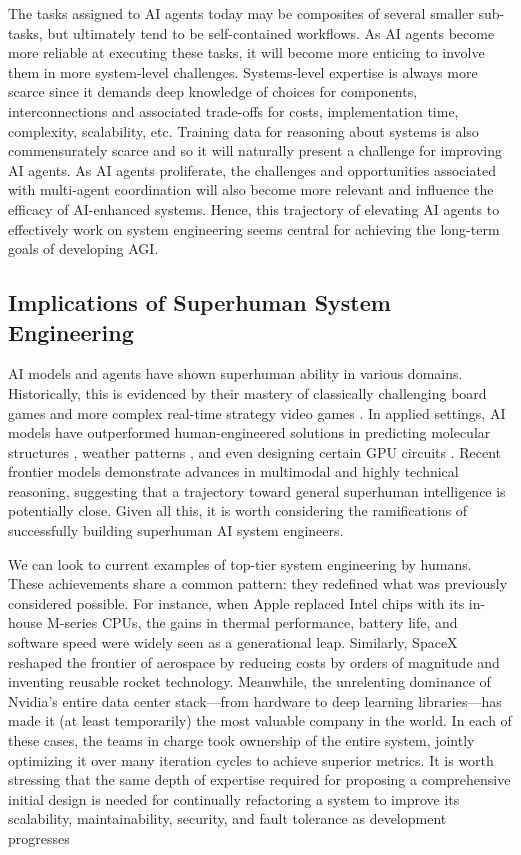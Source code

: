The tasks assigned to AI agents today may be composites of several smaller sub-tasks, but ultimately tend to be self-contained workflows. As AI agents become more reliable at executing these tasks, it will become more enticing to involve them in more system-level challenges. Systems-level expertise is always more scarce since it demands deep knowledge of choices for components, interconnections and associated trade-offs for costs, implementation time, complexity, scalability, etc. Training data for reasoning about systems is also commensurately scarce and so it will naturally present a challenge for improving AI agents. As AI agents proliferate, the challenges and opportunities associated with multi-agent coordination will also become more relevant and influence the efficacy of AI-enhanced systems. Hence, this trajectory of elevating AI agents to effectively work on system engineering seems central for achieving the long-term goals of developing AGI. 

\subsection{Implications of Superhuman System Engineering}

AI models and agents have shown superhuman ability in various domains. Historically, this is evidenced by their mastery of classically challenging board games and more complex real-time strategy video games \cite{silver2017alphazero, vinyals2019alphastar}. In applied settings, AI models have outperformed human-engineered solutions in predicting molecular structures \cite{alphafold2021}, weather patterns \cite{gencast2024}, and even designing certain GPU circuits \cite{prefixrl2021}. Recent frontier models demonstrate advances in multimodal and highly technical reasoning, suggesting that a trajectory toward general superhuman intelligence is potentially close. Given all this, it is worth considering the ramifications of successfully building superhuman AI system engineers.


We can look to current examples of top-tier system engineering by humans. These achievements share a common pattern: they redefined what was previously considered possible. For instance, when Apple replaced Intel chips with its in-house M-series CPUs, the gains in thermal performance, battery life, and software speed were widely seen as a generational leap. Similarly, SpaceX reshaped the frontier of aerospace by reducing costs by orders of magnitude and inventing reusable rocket technology. Meanwhile, the unrelenting dominance of Nvidia’s entire data center stack—from hardware to deep learning libraries—has made it (at least temporarily) the most valuable company in the world. In each of these cases, the teams in charge took ownership of the entire system, jointly optimizing it over many iteration cycles to achieve superior metrics. It is worth stressing that the same depth of expertise required for proposing a comprehensive initial design is needed for continually refactoring a system to improve its scalability, maintainability, security, and fault tolerance as development progresses


